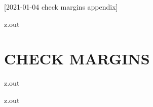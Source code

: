 [2021-01-04 check margins appendix]

\begin{VerbatimOut}{z.out}
\chapter{CHECK MARGINS}
\end{VerbatimOut}

\MyIO


\begin{VerbatimOut}{z.out}

\end{VerbatimOut}

\MyIO


\begin{VerbatimOut}{z.out}
{
  \tiny
}
\end{VerbatimOut}
